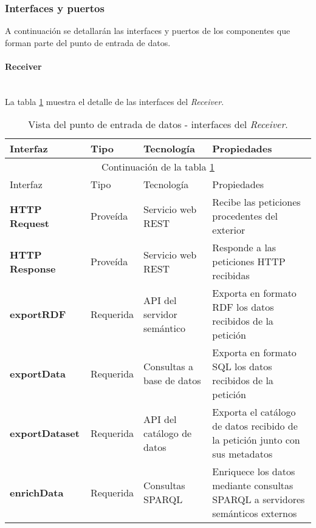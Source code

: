 \subsubsection{Interfaces y puertos}
A continuación se detallarán las interfaces y puertos de los componentes que forman parte del punto de entrada de datos. 

\paragraph{Receiver} \hfill \\
La tabla \ref{interfaces_receiver_receiver} muestra el detalle de las interfaces del \textit{Receiver}.
\begin{longtable}[c]{|p{25mm}|p{20mm}|p{30mm}|p{60mm}|}
 \caption{Vista del punto de entrada de datos - interfaces del \textit{Receiver}.\label{interfaces_receiver_receiver}}\\

 \hline
 	Interfaz & Tipo & Tecnología & Propiedades\\
 \hline
 \hline
 \endfirsthead
 \hline
 \multicolumn{4}{|c|}{Continuación de la tabla \ref{interfaces_receiver_receiver}}\\
 \hline
 	Interfaz & Tipo & Tecnología & Propiedades\\
 \hline
 \hline
 \endhead
 \hline
 \endfoot
 
	\textbf{HTTP Request} & Proveída & Servicio web REST & Recibe las peticiones procedentes del exterior \\
	\hline
		
	\textbf{HTTP Response} & Proveída & Servicio web REST & Responde a las peticiones HTTP recibidas \\
	\hline
	
	\textbf{exportRDF} & Requerida & API del servidor semántico & Exporta en formato RDF los datos recibidos de la petición \\
	\hline
	
	\textbf{exportData} & Requerida & Consultas a base de datos & Exporta en formato SQL los datos recibidos de la petición \\
	\hline
	
	\textbf{exportDataset} & Requerida & API del catálogo de datos & Exporta el catálogo de datos recibido de la petición junto con sus metadatos \\
	\hline
	
	\textbf{enrichData} & Requerida & Consultas SPARQL & Enriquece los datos mediante consultas SPARQL a servidores semánticos externos \\
\hline
\hline

 \end{longtable}
 
